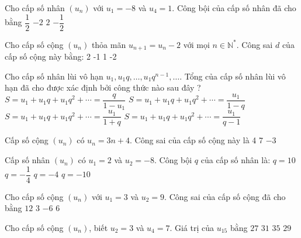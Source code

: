\begin{ex}
Cho cấp số nhân $(u_n)$ với $u_1=-8$ và $u_4=1$. Công bội của cấp số nhân đã cho bằng
\choice
{$\dfrac{1}{2}$}
{$-2$}
{$2$}
{\True $-\dfrac{1}{2}$}
\end{ex}
\begin{ex}
Cho cấp số cộng $(u_n)$ thỏa mãn $u_{n+1}=u_n-2$ với mọi $n\in \mathbb{N}^*$. Công sai $d$ của cấp số cộng này bằng:
\choice
{2}
{-1}
{1}
{-2}
\end{ex}
\begin{ex}
Cho cấp số nhân lùi vô hạn $u_1, u_1q, \ldots, u_1q^{n-1},\ldots$. Tổng của cấp số nhân lùi vô hạn đã cho được xác định bởi công thức nào sau đây ? 
\choice
{$S=u_1+u_1q+u_1q^2+ \cdots=\dfrac{q}{1-u_1}$}
{\True $S=u_1+u_1q+u_1q^2+ \cdots=\dfrac{u_1}{1-q}$}
{$S=u_1+u_1q+u_1q^2+ \cdots=\dfrac{u_1}{1+q}$}
{$S=u_1+u_1q+u_1q^2+ \cdots=\dfrac{u_1}{q-1}$}
\end{ex}
\begin{ex}
Cấp số cộng $(u_n)$ có $u_n=3n+4$. Công sai của cấp số cộng này là
\choice
{4}
{}
{7}
{$-3$}
\end{ex}
\begin{ex}
Cấp số nhân $(u_n)$ có $u_1=2$ và $u_2=-8$. Công bội $q$ của cấp số nhân là:
\choice
{${q=10}$}
{$q=-\dfrac{1}{4}$}
{\True ${q=-4}$}
{${q=-10}$}
\end{ex}
\begin{ex}
Cho cấp số cộng $(u_n)$ với $u_1=3$ và $u_2=9$. Công sai của cấp số cộng đã cho bằng
\choice
{$12$}
{$3$}
{$-6$}
{\True $6$}
\end{ex}
\begin{ex}
Cho cấp số cộng $(u_n)$, biết $u_2=3$ và $u_4=7$. Giá trị của $u_{15}$ bằng
\choice
{$27$}
{$31$}
{$35$}
{\True $29$}
\end{ex}
